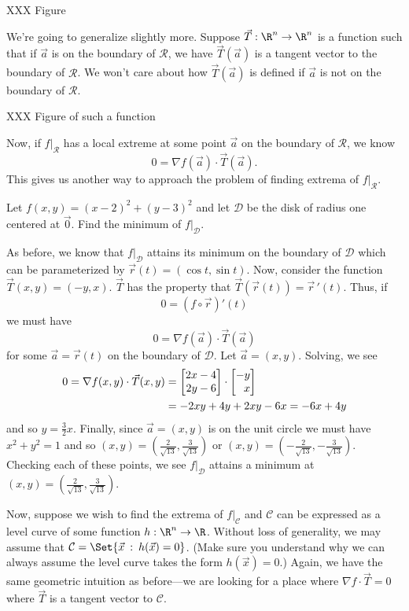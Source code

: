 XXX Figure

We're going to generalize slightly more.  Suppose $\vec T:\R^n\to\R^n$ is a function
such that if $\vec a$ is on the boundary of $\mathcal R$, we
have $\vec T(\vec a)$ is a tangent vector to the boundary of $\mathcal R$.  We won't care
about how $\vec T(\vec a)$ is defined if $\vec a$ is not on the boundary of $\mathcal R$.

XXX Figure of such a function

Now, if $f\big|_{\mathcal R}$ has a local extreme at some point $\vec a$ on the
boundary of $\mathcal R$, we know
\[
	0=\nabla f(\vec a)\cdot \vec T(\vec a).
\]
This gives us another way to approach the problem of finding extrema of $f\big|_{\mathcal R}$.

\begin{example}
	Let $f(x,y)=(x-2)^2+(y-3)^2$
	and let $\mathcal D$ be the disk of radius one centered at $\vec 0$.  Find
	the minimum of $f\big|_{\mathcal D}$.  

	As before, we know that $f\big|_{\mathcal D}$ attains its minimum on the boundary
	of $\mathcal D$ which can be parameterized by $\vec r(t)=(\cos t,\sin t)$.  
	Now, consider the function $\vec T(x,y)=(-y,x)$.  
	$\vec T$ has the property that $\vec T(\vec r(t))=\vec r\,'(t)$.  Thus, if
	\[
		0=(f\circ \vec r)'(t)
	\]
	we must have
	\[
		0=\nabla f(\vec a)\cdot \vec T(\vec a)
	\]
	for some $\vec a=\vec r(t)$ on the boundary of $\mathcal D$.  Let $\vec a=(x,y)$.
	Solving, we see
	\begin{align*}
		0=\nabla f(x,y)\cdot \vec T(x,y)&=\mat{2x-4\\2y-6}\cdot \mat{-y\\x}\\
		&=-2xy+4y+2xy-6x=-6x+4y
	\end{align*}
	and so $y=\tfrac{3}{2}x$.  Finally, since $\vec a=(x,y)$ is on the unit circle
	we must have $x^2+y^2=1$ and so $(x,y)=(\tfrac{2}{\sqrt{13}},
	\tfrac{3}{\sqrt{13}})$ or $(x,y)=(-\tfrac{2}{\sqrt{13}},
	-\tfrac{3}{\sqrt{13}})$.  Checking each of these points, we see $f\big|_{\mathcal D}$
	attains a minimum at $(x,y)=(\tfrac{2}{\sqrt{13}},
	\tfrac{3}{\sqrt{13}})$.
\end{example}

Now, suppose we wish to find the extrema of $f\big|_{\mathcal C}$ and $\mathcal C$ can
be expressed as a level curve of some function $h:\R^n\to\R$.  Without loss of generality, we may
assume that $\mathcal C=\Set{\vec x\given h(\vec x)=0}$.  (Make sure you understand why
we can always assume the level curve takes the form $h(\vec x)=0$.)  Again, we have
the same geometric intuition as before---we are looking for a place where $\nabla f\cdot \vec T=0$
where $\vec T$ is a tangent vector to $\mathcal C$.  

